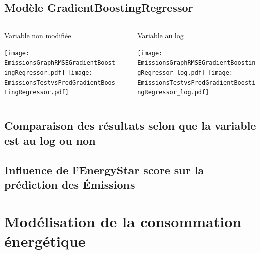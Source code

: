 \documentclass[8pt,aspectratio=169,hyperref={unicode=true}]{beamer}
\begin{document}
\subsection{Modèle GradientBoostingRegressor}
\begin{frame}[t]{\insertsubsection}
  \begin{columns}
    \begin{column}{.33\textwidth}
      {\centering Variable non modifiée

      }
      \texttt{[image: EmissionsGraphRMSEGradientBoostingRegressor.pdf]}
      \texttt{[image: EmissionsTestvsPredGradientBoostingRegressor.pdf]}
    \end{column}
    \begin{column}{.33\textwidth}

    \end{column}
    \begin{column}{.33\textwidth}
      {\centering Variable au log

      }
      \texttt{[image: EmissionsGraphRMSEGradientBoostingRegressor\_log.pdf]}
      \texttt{[image: EmissionsTestvsPredGradientBoostingRegressor\_log.pdf]}
    \end{column}
  \end{columns}
\end{frame}

\subsection{Comparaison des résultats selon que la variable est au log ou non}
\begin{frame}{\insertsubsection}

\end{frame}

\subsection{Influence de l'EnergyStar score sur la prédiction des Émissions}
\begin{frame}{\insertsubsection}

\end{frame}

\section[Modélisation consommation]{Modélisation de la consommation énergétique}
\end{document}
